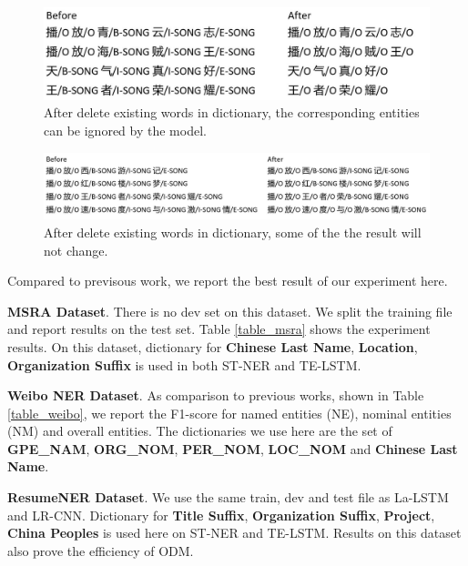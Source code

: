 \documentclass[letterpaper]{article} %
\begin{document}
\begin{figure}[t]
\centering
\includegraphics[width=0.8\columnwidth]{change_after_delete_song} %
\caption{After delete existing words in dictionary, the corresponding entities can be ignored by the model.}
\label{fig4}
\end{figure}

\begin{figure}[t]
\centering
\includegraphics[width=1.0\columnwidth]{no_change_after_delete_song} %
\caption{After delete existing words in dictionary, some of the the result will not change.}
\label{fig5}
\end{figure}

Compared to previsous work, we report the best result of our experiment here.

\textbf{MSRA Dataset}. There is no dev set on this dataset. We split the training file and report results on the test set. Table \ref{table_msra} shows the experiment results. On this dataset, dictionary for \textbf{Chinese Last Name}, \textbf{Location}, \textbf{Organization Suffix} is used in both ST-NER and TE-LSTM. 

\textbf{Weibo NER Dataset}. As comparison to previous works, shown in Table \ref{table_weibo}, we report the F1-score for named entities (NE), nominal  entities (NM) and overall entities. The dictionaries we use here are the set of \textbf{GPE\_NAM}, \textbf{ORG\_NOM}, \textbf{PER\_NOM}, \textbf{LOC\_NOM} and \textbf{Chinese Last Name}. 

\textbf{ResumeNER Dataset}. We use the same train, dev and test file as La-LSTM and LR-CNN. Dictionary for \textbf{Title Suffix}, \textbf{Organization Suffix}, \textbf{Project}, \textbf{China Peoples} is used here on ST-NER and TE-LSTM. Results on this dataset also prove the efficiency of ODM.
\end{document}

